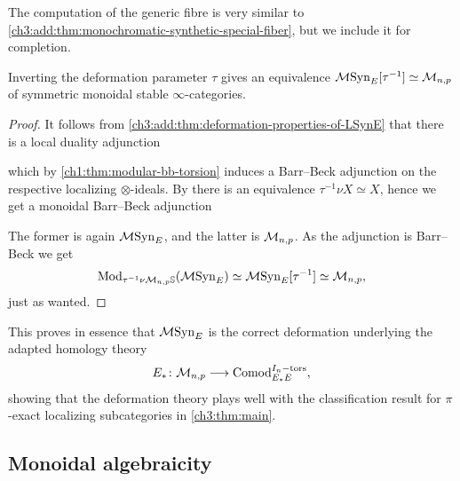 The computation of the generic fibre is very similar to \cref{ch3:add:thm:monochromatic-synthetic-special-fiber}, but we include it for completion. 

\begin{theorem}
    Inverting the deformation parameter $\tau$ gives an equivalence $\mathcal{M}\mathrm{Syn}_{E}[\tau^{-1}] \simeq \mathcal{M}_{n,p}$ of symmetric monoidal stable $\infty$-categories. 
\end{theorem}
\begin{proof}
    It follows from \cref{ch3:add:thm:deformation-properties-of-LSynE} that there is a local duality adjunction 
    \begin{center}
    \end{center}
    which by \cref{ch1:thm:modular-bb-torsion} induces a Barr--Beck adjunction on the respective localizing $\otimes$-ideals. By \cite[4.40]{pstragowski_2022} there is an equivalence $\tau^{-1}\nu X \simeq X$, hence we get a monoidal Barr--Beck adjunction 
    \begin{center}
    \end{center}
    The former is again $\mathcal{M}\mathrm{Syn}_{E}$, and the latter is $\mathcal{M}_{n,p}$. As the adjunction is Barr--Beck we get 
    \[\mathrm{Mod}_{\tau^{-1}\nu \mathcal{M}_{n,p}\mathbb{S}}(\mathcal{M}\mathrm{Syn}_{E})\simeq \mathcal{M}\mathrm{Syn}_{E}[\tau^{-1}]\simeq \mathcal{M}_{n,p},\]
    just as wanted. 
\end{proof}

This proves in essence that $\mathcal{M}\mathrm{Syn}_{E}$ is the correct deformation underlying the adapted homology theory 
\[E_*\colon \mathcal{M}_{n,p} \longrightarrow \mathrm{Comod}_{E_*E}^{I_n-\mathrm{tors}},\] 
showing that the deformation theory plays well with the classification result for $\pi$-exact localizing subcategories in \cref{ch3:thm:main}. 

\subsection{Monoidal algebraicity}

